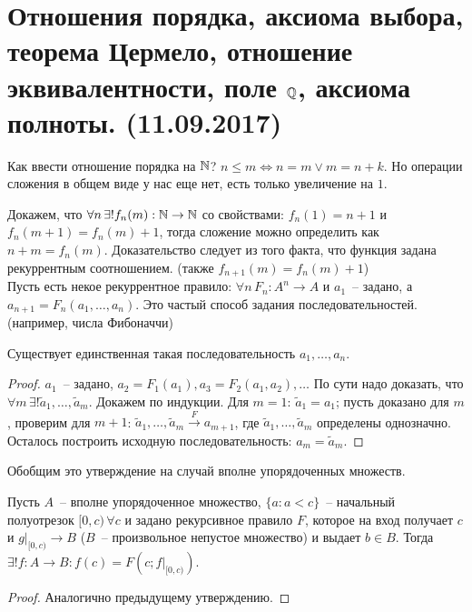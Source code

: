 \section{Отношения порядка, аксиома выбора, теорема Цермело, отношение эквивалентности, поле $\mathbb{Q}$, аксиома полноты. (11.09.2017)}

Как ввести отношение порядка на $\mathbb{N}$? $n \le m \Leftrightarrow n=m \lor m=n+k$. Но операции сложения в общем виде у нас еще нет, есть только увеличение на $1$.

Докажем, что $\forall n\, \exists! f_n(m): \mathbb{N} \to \mathbb{N}$ со свойствами: $f_n(1) = n+1$ и $f_n(m+1) = f_n(m) + 1$, тогда сложение можно определить как $n+m = f_n(m)$. Доказательство следует из того факта, что функция задана рекуррентным соотношением. (также $f_{n+1}(m) = f_n(m) + 1$)\\

Пусть есть некое рекуррентное правило: $\forall n\, F_n: A^n \to A$ и $a_1$~-- задано, а $a_{n+1} = F_n(a_1, \dots, a_n)$. Это частый способ задания последовательностей. (например, числа Фибоначчи)
\begin{claim}
	Существует единственная такая последовательность $a_1, \dots, a_n$.
\end{claim}
\begin{proof}
	$a_1$~-- задано, $a_2 = F_1(a_1), a_3 = F_2(a_1, a_2), \dots$ По сути надо доказать, что $\forall m\, \exists! \tilde{a}_1, \dots, \tilde{a}_m$. Докажем по индукции. Для $m=1$: $\tilde{a}_1 = a_1$; пусть доказано для $m$, проверим для $m+1$: $\tilde{a}_1, \dots, \tilde{a}_m \stackrel{F}{\longrightarrow} a_{m+1}$, где $\tilde{a}_1, \dots, \tilde{a}_m$ определены однозначно. Осталось построить исходную последовательность: $a_m = \tilde{a}_m$.
\end{proof}

Обобщим это утверждение на случай вполне упорядоченных множеств.
\begin{theo}
	Пусть $A$~-- вполне упорядоченное множество, $\{a: a < c\}$~-- начальный полуотрезок $[0,c)\, \forall c$ и задано рекурсивное правило $F$, которое на вход получает $c$ и $g|_{[0,c)} \to B$ ($B$~-- произвольное непустое множество) и выдает $b \in B$. Тогда $\exists! f: A \to B: f(c) = F(c; f|_{[0,c)})$.
\end{theo}
\begin{proof}
	Аналогично предыдущему утверждению.
\end{proof}

